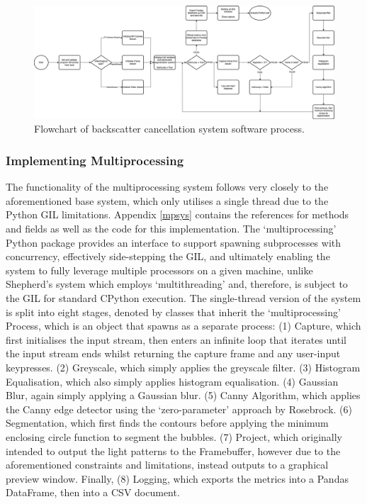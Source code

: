 \pagebreak
\begin{landscape}
    \begin{figure}
        \centering
        \includegraphics[width=1\linewidth]{assets/impl_system-flow.png}
        \caption{Flowchart of backscatter cancellation system software process.}
        \label{fig:sysflow}
    \end{figure}
\end{landscape}
\pagebreak

\subsubsection{Implementing Multiprocessing}

The functionality of the multiprocessing system follows very closely to the aforementioned base system, which only utilises a single thread due to the Python GIL limitations. Appendix \ref{mpsys} contains the references for methods and fields as well as the code for this implementation. The `multiprocessing' Python package provides an interface to support spawning subprocesses with concurrency, effectively side-stepping the GIL, and ultimately enabling the system to fully leverage multiple processors on a given machine, unlike Shepherd's system which employs `multithreading' and, therefore, is subject to the GIL for standard CPython execution. The single-thread version of the system is split into eight stages, denoted by classes that inherit the `multiprocessing' Process, which is an object that spawns as a separate process: (1) Capture, which first initialises the input stream, then enters an infinite loop that iterates until the input stream ends whilst returning the capture frame and any user-input keypresses. (2) Greyscale, which simply applies the greyscale filter. (3) Histogram Equalisation, which also simply applies histogram equalisation. (4) Gaussian Blur, again simply applying a Gaussian blur. (5) Canny Algorithm, which applies the Canny edge detector using the `zero-parameter' approach by Rosebrock. (6) Segmentation, which first finds the contours before applying the minimum enclosing circle function to segment the bubbles. (7) Project, which originally intended to output the light patterns to the Framebuffer, however due to the aforementioned constraints and limitations, instead outputs to a graphical preview window. Finally, (8) Logging, which exports the metrics into a Pandas DataFrame, then into a CSV document.

